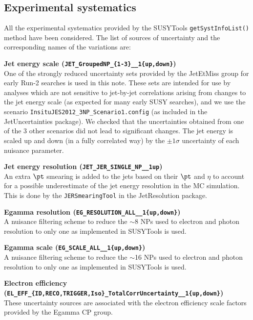 
\subsection{Experimental systematics}
\label{sec:syst_exp}

All the  experimental systematics provided by the SUSYTools {\tt getSystInfoList()} method have been considered. 
The list of sources of uncertainty and the corresponding names of the variations are:

\textbf{Jet energy scale ({\tt{JET\_GroupedNP\_\{1-3\}\_\_1\{up,down\}}})}  \\
One of the strongly reduced uncertainty sets provided by the JetEtMiss group for early Run-2 searches is used in this note. 
These sets are intended for use by analyses which are not sensitive to jet-by-jet correlations arising from changes to the jet energy scale 
(as expected for many early SUSY searches), 
and we use the scenario {\tt InsituJES2012\_3NP\_Scenario1.config} (as included in the JetUncertainties package). 
We checked that the uncertainties obtained from one of the 3 other scenarios did not lead to significant changes. 
The jet energy is scaled up and down (in a fully correlated way) by the $\pm 1\sigma$ uncertainty of each nuisance parameter.

\textbf{Jet energy resolution ({\tt{JET\_JER\_SINGLE\_NP\_\_1up}})} \\
An extra $\pt$ smearing is added to the jets based on their $\pt$ and $\eta$ to account for a possible underestimate of the jet energy resolution in the MC simulation. This is done by the {\tt JERSmearingTool} in the JetResolution package.

\textbf{Egamma resolution ({\tt{EG\_RESOLUTION\_ALL\_\_1\{up,down\}}})} \\
A nuisance filtering scheme to reduce the $\sim$8 NPs used to electron and photon resolution to only one as implemented in SUSYTools is used.

\textbf{Egamma scale ({\tt{EG\_SCALE\_ALL\_\_1\{up,down\}}})}\\
A nuisance filtering scheme to reduce the $\sim$16 NPs used to electron and photon resolution to only one as implemented in SUSYTools is used.

\textbf{Electron efficiency ({\tt{EL\_EFF\_\{ID,RECO,TRIGGER,Iso\}\_TotalCorrUncertainty\_\_1\{up,down\}}})} \\
These uncertainty sources are associated with the electron efficiency scale factors provided by the Egamma CP group.

